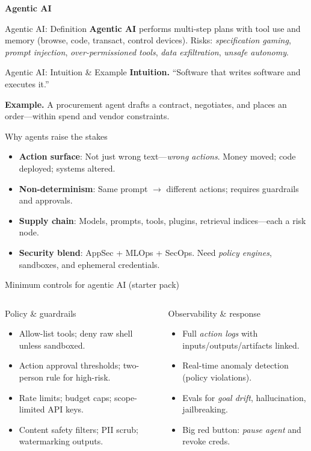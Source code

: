 \documentclass[11pt,aspectratio=169]{beamer}
\newcommand{\Term}[1]{%
  \begin{frame}
    \centering\vfill
    {\usebeamerfont{title}\usebeamercolor[fg]{title}\Huge\textbf{#1}}
    \vfill
  \end{frame}
}
\newcommand{\Definition}[2]{%
  \begin{frame}{#1: \;Definition}
    \justifying
    #2
  \end{frame}
}
\newcommand{\Intuition}[3]{%
  \begin{frame}{#1: \;Intuition \& Example}
    \justifying
    \textbf{Intuition.} #2
    \medskip

    \textbf{Example.} #3
  \end{frame}
}
\begin{document}
\Term{Agentic AI}
\Definition{Agentic AI}{\justifying
\textbf{Agentic AI} performs multi-step plans with tool use and memory (browse, code, transact, control devices). Risks: \emph{specification gaming}, \emph{prompt injection}, \emph{over-permissioned tools}, \emph{data exfiltration}, \emph{unsafe autonomy}.}
\Intuition{Agentic AI}{“Software that writes software and executes it.”}{A procurement agent drafts a contract, negotiates, and places an order—within spend and vendor constraints.}

\begin{frame}{Why agents raise the stakes}
\begin{itemize}
  \item \textbf{Action surface}: Not just wrong text—\emph{wrong actions}. Money moved; code deployed; systems altered.
  \item \textbf{Non-determinism}: Same prompt $\rightarrow$ different actions; requires guardrails and approvals.
  \item \textbf{Supply chain}: Models, prompts, tools, plugins, retrieval indices—each a risk node.
  \item \textbf{Security blend}: AppSec + MLOps + SecOps. Need \emph{policy engines}, sandboxes, and ephemeral credentials.
\end{itemize}
\end{frame}

\begin{frame}{Minimum controls for agentic AI (starter pack)}
\begin{columns}[T,onlytextwidth]
\begin{block}{Policy \& guardrails}
\begin{itemize}
  \item Allow-list tools; deny raw shell unless sandboxed.
  \item Action approval thresholds; two-person rule for high-risk.
  \item Rate limits; budget caps; scope-limited API keys.
  \item Content safety filters; PII scrub; watermarking outputs.
\end{itemize}
\end{block}
\begin{block}{Observability \& response}
\begin{itemize}
  \item Full \emph{action logs} with inputs/outputs/artifacts linked.
  \item Real-time anomaly detection (policy violations).
  \item Evals for \emph{goal drift}, hallucination, jailbreaking.
  \item Big red button: \emph{pause agent} and revoke creds.
\end{itemize}
\end{block}
\end{columns}
\end{frame}
\end{document}
